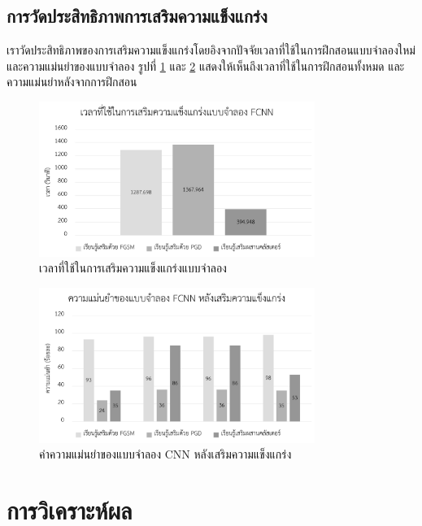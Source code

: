\subsection{การวัดประสิทธิภาพการเสริมความแข็งแกร่ง}

เราวัดประสิทธิภาพของการเสริมความแข็งแกร่งโดยอิงจากปัจจัยเวลาที่ใช้ในการฝึกสอนแบบจำลองใหม่ และความแม่นยำของแบบจำลอง รูปที่ \ref{time-used} และ \ref{acc-after} แสดงให้เห็นถึงเวลาที่ใช้ในการฝึกสอนทั้งหมด และความแม่นยำหลังจากการฝึกสอน

\begin{figure}
    \centering
    \includegraphics[width=0.8\textwidth]{images/time.pdf}
    \caption{เวลาที่ใช้ในการเสริมความแข็งแกร่งแบบจำลอง}
    \label{time-used}
\end{figure}

\begin{figure}
    \centering
    \includegraphics[width=0.8\textwidth]{images/fcnn-acc-after.pdf}
    \caption{ค่าความแม่นยำของแบบจำลอง CNN หลังเสริมความแข็งแกร่ง}
    \label{acc-after}
\end{figure}

\section{การวิเคราะห์ผล}

